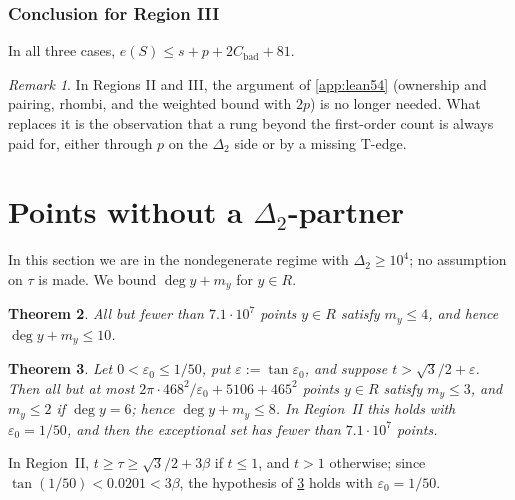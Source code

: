 \documentclass[11pt]{amsart}
\newtheorem{theorem}{Theorem}[section]
\theoremstyle{definition}
\theoremstyle{remark}
\newtheorem{remark}[theorem]{Remark}
\newcommand{\Dt}{\Delta_2}
\newcommand{\eps}{\varepsilon}
\begin{document}
\subsubsection*{Conclusion for Region III}
In all three cases, $e(S)\le s+p+2C_{\mathrm{bad}}+81$.

\begin{remark}
In Regions II and III, the argument of \cref{app:lean54} (ownership and pairing, rhombi, and the weighted bound with $2p$) is no longer needed. What replaces it is the observation that a rung beyond the first-order count is always paid for, either through $p$ on the $\Dt$ side or by a missing T-edge.
\end{remark}

\section{Points without a \texorpdfstring{$\Dt$}{Delta2}-partner}\label{sec:Rpoints}

In this section we are in the nondegenerate regime with $\Dt\ge10^4$; no assumption on $\tau$ is made. We bound $\deg y+m_y$ for $y\in R$.

\begin{theorem}\label{thm:N1}
All but fewer than $7.1\cdot10^7$ points $y\in R$ satisfy $m_y\le4$, and hence $\deg y+m_y\le10$.
\end{theorem}

\begin{theorem}\label{thm:N2}
Let $0<\eps_0\le1/50$, put $\eps:=\tan\eps_0$, and suppose $t>\sqrt3/2+\eps$. Then all but at most $2\pi\cdot468^2/\eps_0+5106+465^2$ points $y\in R$ satisfy $m_y\le3$, and $m_y\le2$ if $\deg y=6$; hence $\deg y+m_y\le8$. In Region~II this holds with $\eps_0=1/50$, and then the exceptional set has fewer than $7.1\cdot10^7$ points.
\end{theorem}
In Region~II, $t\ge\tau\ge\sqrt3/2+3\beta$ if $t\le1$, and $t>1$ otherwise; since $\tan(1/50)<0.0201<3\beta$, the hypothesis of \cref{thm:N2} holds with $\eps_0=1/50$.
\end{document}
